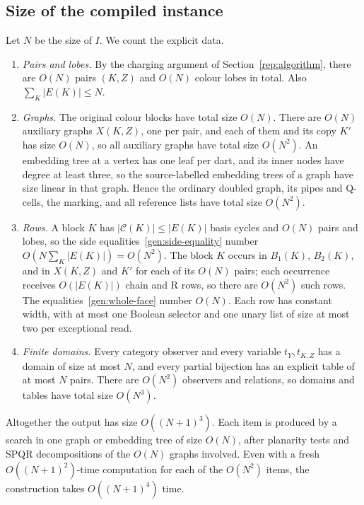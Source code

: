 \subsection{Size of the compiled instance}
\label{gen:size}

Let $N$ be the size of $I$.  We count the explicit data.
\begin{enumerate}
\item \emph{Pairs and lobes.}  By the charging argument of
      Section~\ref{rep:algorithm}, there are $O(N)$ pairs $(K,Z)$ and
      $O(N)$ colour lobes in total.  Also $\sum_K|E(K)|\le N$.
\item \emph{Graphs.}  The original colour blocks have total size $O(N)$.
      There are $O(N)$ auxiliary graphs $X(K,Z)$, one per pair, and each of
      them and its copy $K'$ has size $O(N)$, so all auxiliary graphs have
      total size $O(N^2)$.  An embedding tree at
      a vertex has one leaf per dart, and its inner nodes have degree at
      least three, so the source-labelled embedding trees of a graph have
      size linear in that graph.  Hence the ordinary doubled graph, its
      pipes and Q-cells, the marking, and all reference lists have total
      size $O(N^2)$.
\item \emph{Rows.}  A block $K$ has $|\mathcal C(K)|\le|E(K)|$ basis
      cycles and $O(N)$ pairs and lobes, so the side
      equalities~\eqref{gen:side-equality} number
      $O(N\sum_K|E(K)|)=O(N^2)$.  The block $K$ occurs in $B_1(K)$,
      $B_2(K)$, and in $X(K,Z)$ and $K'$ for each of its $O(N)$ pairs; each
      occurrence receives $O(|E(K)|)$ chain and R rows, so there are
      $O(N^2)$ such rows.  The equalities~\eqref{gen:whole-face} number
      $O(N)$.  Each row has constant width, with at most one Boolean
      selector and one unary list of size at most two per exceptional
      read.
\item \emph{Finite domains.}  Every category observer and every variable
      $t_Y,t_{K,Z}$ has a domain of size at most $N$, and every partial
      bijection has an explicit table of at most $N$ pairs.  There are
      $O(N^2)$ observers and relations, so domains and tables have total
      size $O(N^3)$.
\end{enumerate}
Altogether the output has size $O((N+1)^3)$.  Each item is produced by a
search in one graph or embedding tree of size $O(N)$, after planarity
tests and SPQR decompositions of the $O(N)$ graphs involved.  Even with a
fresh $O((N+1)^2)$-time computation for each of the $O(N^2)$ items, the
construction takes $O((N+1)^4)$ time.

